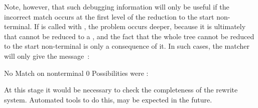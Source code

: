 \documentclass[11pt]{article}
\begin{document}
Note, however, that such debugging information will only be useful if the
incorrect match occurs at the first level of the reduction to the start
non-terminal.  If  is called with , the
problem occurs deeper, because it is ultimately  that cannot be
reduced to a , and the fact that the whole tree cannot be reduced
to the start non-terminal is only a consequence of it.  In such cases, the
matcher will only give the message~:
\begin{code}
    No Match on nonterminal 0
    Possibilities were : 
\end{code}
At this stage it would be necessary to check the completeness of the
rewrite system. Automated tools to do this, may be expected in the
future\cite{emmelmann-92}. 



\end{document}
